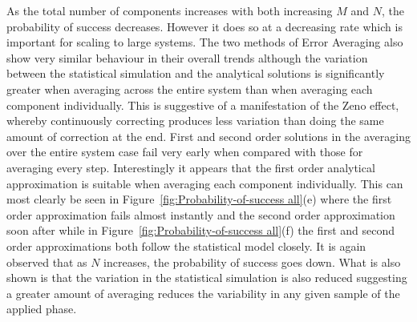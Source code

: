 \documentclass[aps,pra,twocolumn,superscriptaddress,numerical,floatfix]{revtex4-1}
\begin{document}
As the total number of components increases with both increasing $M$ and $N$, the probability of success decreases. However it does so at a decreasing rate which is important for scaling to large systems. The two methods of Error Averaging also show very similar behaviour in their overall trends although the variation between the statistical simulation and the analytical solutions is significantly greater when averaging across the entire system than when averaging each component individually. This is suggestive of a manifestation of the Zeno effect, whereby continuously correcting produces less variation than doing the same amount of correction at the end. First and second order solutions in the averaging over the entire system case fail very early when compared with those for averaging every step. Interestingly it appears that the first order analytical approximation is suitable when averaging each component individually. This can most clearly be seen in Figure~\ref{fig:Probability-of-success all}(e) where the first order approximation fails almost instantly and the second order approximation soon after while in Figure~\ref{fig:Probability-of-success all}(f) the first and second order approximations both follow the statistical model closely. It is again observed that as $N$ increases, the probability of success goes down. What is also shown is that the variation in the statistical simulation is also reduced suggesting a greater amount of averaging reduces the variability in any given sample of the applied phase.
%
\end{document}
